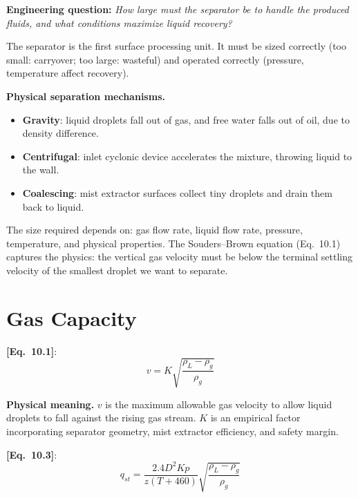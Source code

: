 \documentclass[11pt,a4paper,openany]{book}
\newcommand{\eqrefbook}[1]{\textcolor{blue!60!black}{\textbf{[Eq.~#1]}}}
\begin{document}
\begin{purpose}
\textbf{Engineering question:} \emph{How large must the separator be
to handle the produced fluids, and what conditions maximize liquid
recovery?}

The separator is the first surface processing unit. It must be sized
correctly (too small: carryover; too large: wasteful) and operated
correctly (pressure, temperature affect recovery).
\end{purpose}

\begin{theory}
\textbf{Physical separation mechanisms.}
\begin{itemize}
  \item \textbf{Gravity}: liquid droplets fall out of gas, and free
        water falls out of oil, due to density difference.
  \item \textbf{Centrifugal}: inlet cyclonic device accelerates the
        mixture, throwing liquid to the wall.
  \item \textbf{Coalescing}: mist extractor surfaces collect tiny
        droplets and drain them back to liquid.
\end{itemize}

The size required depends on: gas flow rate, liquid flow rate,
pressure, temperature, and physical properties. The Souders--Brown
equation (Eq.~10.1) captures the physics: the vertical gas velocity
must be below the terminal settling velocity of the smallest droplet
we want to separate.
\end{theory}

\section{Gas Capacity}

\eqrefbook{10.1}:
\begin{equation}
  v = K\sqrt{\frac{\rho_L - \rho_g}{\rho_g}}
\end{equation}

\begin{theory}
\textbf{Physical meaning.} $v$ is the maximum allowable gas velocity
to allow liquid droplets to fall against the rising gas stream. $K$
is an empirical factor incorporating separator geometry, mist
extractor efficiency, and safety margin.
\end{theory}

\eqrefbook{10.3}:
\begin{equation}
  q_{st} = \frac{2.4 D^2 K p}{z(T + 460)}
  \sqrt{\frac{\rho_L - \rho_g}{\rho_g}}
\end{equation}
\end{document}
